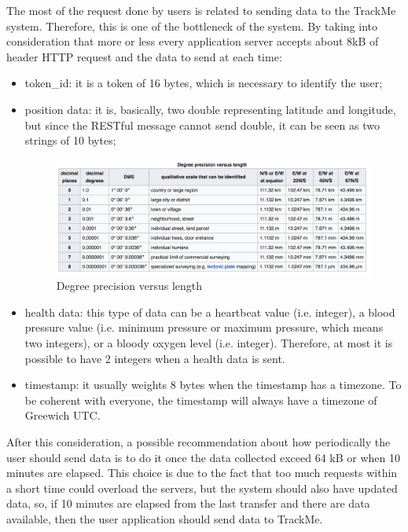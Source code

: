 The most of the request done by users is related to sending data to the TrackMe system. Therefore, this is one of the bottleneck 
of the system. By taking into consideration that more or less every application server accepts about 8kB of header HTTP request and the data to send at each time:
\begin{itemize}
\item token\_id: it is a token of 16 bytes, which is necessary to identify the user;
\item position data: it is, basically, two double representing latitude and longitude, but since the RESTful message cannot send double, it can be seen as two strings of 10 bytes;
\begin{figure}[H]
\includegraphics[width=\linewidth]{Images/gpsprecision.pdf}
\caption{ Degree precision versus length }
\label{fig:precisiongps}
\end{figure}
\item health data: this type of data can be a heartbeat value (i.e. integer), a blood pressure value (i.e. minimum pressure or maximum pressure, which means two integers), or a bloody oxygen level (i.e. integer). Therefore, at most it is possible to have 2 integers when a health data is sent.
\item timestamp: it usually weights 8 bytes when the timestamp has a timezone. To be coherent with everyone, the timestamp will always have a timezone of Greewich UTC.
\end{itemize}
After this consideration, a possible recommendation about how periodically the user should send data is to do it once the data collected exceed 64 kB or when 10 minutes are elapsed. This choice is due to the fact that too much requests within a short time could overload the servers, but the system should also have updated data, so, if 10 minutes are elapsed from the last transfer and there are data available, then  the user application should send data to TrackMe.
